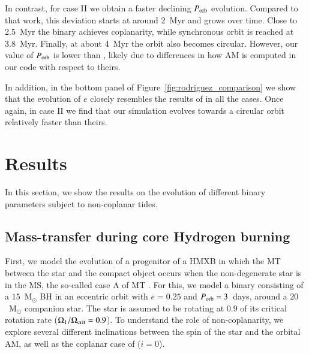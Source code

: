 \documentclass{aa}
\begin{document}
In contrast, for case II we obtain a faster declining $P_{\rm orb}$ evolution. Compared to that work, this deviation starts at around 2~Myr
and grows over time. Close to 2.5~Myr the binary achieves coplanarity, while synchronous orbit is reached at 3.8~Myr. Finally, at about
4~Myr the orbit also becomes circular. However, our value of $P_{\rm orb}$ is lower than \citet{rodriguez2021}, likely due to differences
in how AM is computed in our code with respect to theirs.

In addition, in the bottom panel of Figure~\ref{fig:rodriguez_comparison} we show that the evolution of $e$ closely resembles the results
of \citet{rodriguez2021} in all the cases. Once again, in case II we find that our simulation evolves towards a circular orbit relatively
faster than theirs.

\section{Results}
\label{section:results}

In this section, we show the results on the evolution of different binary parameters subject to non-coplanar tides.

\subsection{Mass-transfer during core Hydrogen burning}
\label{subsection:results-caseA}

First, we model the evolution of a progenitor of a HMXB in which the MT between the star and the compact object occurs when the
non-degenerate star is in the MS, the so-called case A of MT \citep{kippenhahn1967}. For this, we model a binary consisting of a
$15$~M$_\odot$ BH in an eccentric orbit with $e = 0.25$ and $P_{\rm orb} = 3$~days, around a $20$~M$_\odot$ companion star. The star is
assumed to be rotating at $0.9$ of its critical rotation rate ($\Omega_1 / \Omega_{\rm crit} = 0.9$). To understand the role of
non-coplanarity, we explore several different  inclinations between the spin of the star and the orbital AM, as well as the coplanar case
of ($i = 0$).
\end{document}
